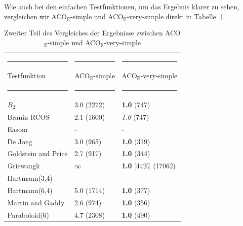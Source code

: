 \documentclass[fontsize=12, a4aper]{scrartcl}
\begin{document}
	Wie auch bei den einfachen Testfunktionen, um das Ergebnis klarer zu sehen, vergleichen wir ACO\(_{\mathbb{R}}\)-simple und ACO\(_{\mathbb{R}}\)-very-simple direkt in Tabelle~\ref{VerglelichACORSimpleundACORVerySimpleTeil2}
	
	\begin{table}[H]
		
		\fontsize{10pt}{12pt}
		
		\caption{Zweiter Teil des Vergleiches der Ergebnisse zwischen ACO\(_{\mathbb{R}}\)-simple und ACO\(_{\mathbb{R}}\)-very-simple}
		
		\label{VerglelichACORSimpleundACORVerySimpleTeil2}
		
		\begin{tabularx}{\textwidth}{l|l|l}
			
			\rule{4.8cm}{0.4pt} & \rule{4.8cm}{0.4pt} & \rule{4.8cm}{0.4pt}\\
			
			Testfunktion & ACO\(_{\mathbb{R}}\)-simple & ACO\(_{\mathbb{R}}\)-very-simple\\
			
			\rule{4.8cm}{0.4pt} & \rule{4.8cm}{0.4pt} & \rule{4.8cm}{0.4pt}\\
			
			\(B_2\) & 3.0 (2272) & \textbf{1.0} (747)\\
			
			Branin RCOS & 2.1 (1600) & \textit{1.0} (747)\\
			
			Easom & - & -\\
			
			De Jong & 3.0 (965) & \textbf{1.0} (319)\\
			
			Goldstein and Price & 2.7 (917) & \textbf{1.0} (344)\\
			
			Griewangk & \(\infty\) & \textbf{1.0} [44\%] (17062)\\
			
			Hartmann(3,4) & - & -\\
			
			Hartmann(6,4) & 5.0 (1714) & \textbf{1.0} (377)\\
			
			Martin and Gaddy & 2.6 (974) & \textbf{1.0} (356)\\
			
			Paraboloid(6) & 4.7 (2308) & \textbf{1.0} (490)\\
			

\end{tabularx}
\end{table}
\end{document}
